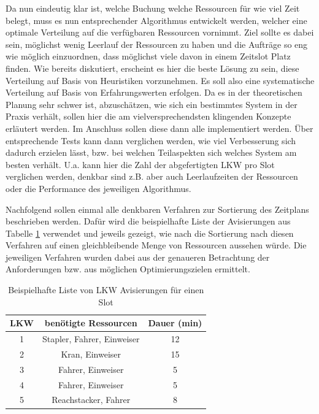 Da nun eindeutig klar ist, welche Buchung welche Ressourcen für wie viel Zeit belegt, muss es nun entsprechender Algorithmus entwickelt werden, welcher eine optimale Verteilung auf die verfügbaren Ressourcen vornimmt. Ziel sollte es dabei sein, möglichst wenig Leerlauf der Ressourcen zu haben und die Aufträge so eng wie möglich einzuordnen, dass möglichst viele davon in einem Zeitslot Platz finden. Wie bereits diskutiert, erscheint es hier die beste Lösung zu sein, diese Verteilung auf Basis von Heuristiken vorzunehmen. Es soll also eine systematische Verteilung auf Basis von Erfahrungswerten erfolgen. Da es in der theoretischen Planung sehr schwer ist, abzuschätzen, wie sich ein bestimmtes System in der Praxis verhält, sollen hier die am vielversprechendsten klingenden Konzepte erläutert werden. Im Anschluss sollen diese dann alle implementiert werden. Über entsprechende Tests kann dann verglichen werden, wie viel Verbesserung sich dadurch erzielen lässt, bzw. bei welchen Teilaspekten sich welches System am besten verhält. U.a. kann hier die Zahl der abgefertigten LKW pro Slot verglichen werden, denkbar sind z.B. aber auch Leerlaufzeiten der Ressourcen oder die Performance des jeweiligen Algorithmus.



Nachfolgend sollen einmal alle denkbaren Verfahren zur Sortierung des Zeitplans beschrieben werden. Dafür wird die beispielhafte Liste der Avisierungen aus Tabelle \ref{tab:exampleAdvices} verwendet und jeweils gezeigt, wie nach die Sortierung nach diesen Verfahren auf einen gleichbleibende Menge von Ressourcen aussehen würde. Die jeweiligen Verfahren wurden dabei aus der genaueren Betrachtung der Anforderungen bzw. aus möglichen Optimierungszielen ermittelt.

\begin{table}[!h]
\begin{center}
\caption{Beispielhafte Liste von LKW Avisierungen für einen Slot}
\label{tab:exampleAdvices}
\begin{tabular}{c|c|c} 
    LKW & benötigte Ressourcen & Dauer (min) \\\hline
    1 & Stapler, Fahrer, Einweiser & 12 \\\hline
    2 & Kran, Einweiser & 15 \\\hline
    3 & Fahrer, Einweiser & 5 \\\hline
    4 & Fahrer, Einweiser & 5 \\\hline
    5 & Reachstacker, Fahrer & 8 \\
\end{tabular}
\end{center}
\end{table}

